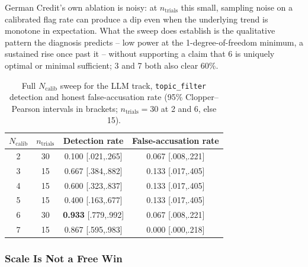 \documentclass[10pt,journal,compsoc]{IEEEtran}
\begin{document}
German Credit's own ablation is noisy: at $n_{\text{trials}}$ this small, sampling noise on a calibrated flag rate can produce a dip even when the underlying trend is monotone in expectation. What the sweep does establish is the qualitative pattern the diagnosis predicts -- low power at the 1-degree-of-freedom minimum, a sustained rise once past it -- without supporting a claim that 6 is uniquely optimal or minimal sufficient; 3 and 7 both also clear 60\%.

\begin{table}[t]
\centering
\footnotesize
\caption{Full $N_{\text{calib}}$ sweep for the LLM track, \texttt{topic\_filter} detection and honest false-accusation rate (95\% Clopper--Pearson intervals in brackets; $n_{\text{trials}}{=}30$ at 2 and 6, else 15).}
\label{tab:llmcalibsweep}
\begin{tabular}{@{}cccc@{}}
\toprule
$N_{\text{calib}}$ & $n_{\text{trials}}$ & Detection rate & False-accusation rate \\
\midrule
2 & 30 & 0.100 [.021,.265] & 0.067 [.008,.221] \\
3 & 15 & 0.667 [.384,.882] & 0.133 [.017,.405] \\
4 & 15 & 0.600 [.323,.837] & 0.133 [.017,.405] \\
5 & 15 & 0.400 [.163,.677] & 0.133 [.017,.405] \\
6 & 30 & \textbf{0.933} [.779,.992] & 0.067 [.008,.221] \\
7 & 15 & 0.867 [.595,.983] & 0.000 [.000,.218] \\
\bottomrule
\end{tabular}
\end{table}

\subsubsection{Scale Is Not a Free Win}
\end{document}
